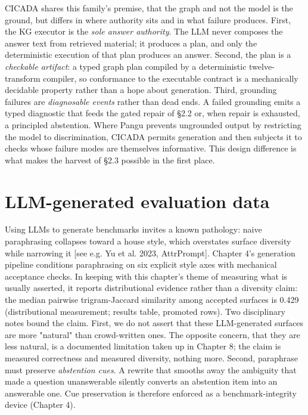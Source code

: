 CICADA shares this family's premise, that the graph and not the model is the ground, but differs in where authority sits and in what failure produces. First, the KG executor is the \emph{sole answer authority}. The LLM never composes the answer text from retrieved material; it produces a plan, and only the deterministic execution of that plan produces an answer. Second, the plan is a \emph{checkable artifact}: a typed graph plan compiled by a deterministic twelve-transform compiler, so conformance to the executable contract is a mechanically decidable property rather than a hope about generation. Third, grounding failures are \emph{diagnosable events} rather than dead ends. A failed grounding emits a typed diagnostic that feeds the gated repair of §2.2 or, when repair is exhausted, a principled abstention. Where Pangu prevents ungrounded output by restricting the model to discrimination, CICADA permits generation and then subjects it to checks whose failure modes are themselves informative. This design difference is what makes the harvest of §2.3 possible in the first place.

\section{LLM-generated evaluation data}\label{sec:llm-generated-evaluation-data}

Using LLMs to generate benchmarks invites a known pathology: naive paraphrasing collapses toward a house style, which overstates surface diversity while narrowing it [see e.g. Yu et al. 2023, AttrPrompt]. Chapter 4's generation pipeline conditions paraphrasing on six explicit style axes with mechanical acceptance checks. In keeping with this chapter's theme of measuring what is usually asserted, it reports distributional evidence rather than a diversity claim: the median pairwise trigram-Jaccard similarity among accepted surfaces is 0.429 (distributional measurement; results table, promoted rows). Two disciplinary notes bound the claim. First, we do not assert that these LLM-generated surfaces are more "natural" than crowd-written ones. The opposite concern, that they are less natural, is a documented limitation taken up in Chapter 8; the claim is measured correctness and measured diversity, nothing more. Second, paraphrase must preserve \emph{abstention cues}. A rewrite that smooths away the ambiguity that made a question unanswerable silently converts an abstention item into an answerable one. Cue preservation is therefore enforced as a benchmark-integrity device (Chapter 4).

